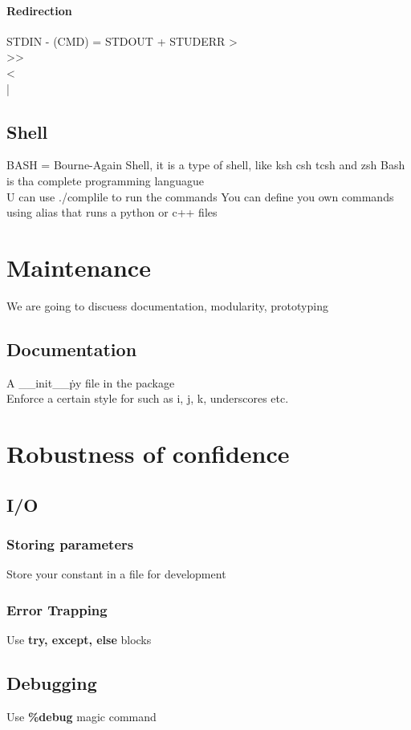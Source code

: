 \documentclass[12pt,a4paper]{article}
\begin{document}
\paragraph{Redirection}
    STDIN - (CMD) = STDOUT + STUDERR
    >\\
    >>\\
    <\\
    |\\

\subsection{Shell}
BASH = Bourne-Again Shell, it is a type of shell, like ksh csh tcsh and zsh
Bash is tha complete programming languague\\
U can use ./complile to run the commands
You can define you own commands using alias that runs a python or c++ files

\section{Maintenance}
We are going to discuess documentation, modularity, prototyping
\subsection{Documentation}
    A \_\_init\_\_\.py file in the package\\
    Enforce a certain style for such as i, j, k, underscores etc.

\section{Robustness of confidence}
\subsection{I/O}
\subsubsection{Storing parameters}
    Store your constant in a file for development
\subsubsection{Error Trapping}
    Use \textbf{try, except, else} blocks
\subsection{Debugging}
    Use \textbf{\%debug} magic command 
\end{document}
